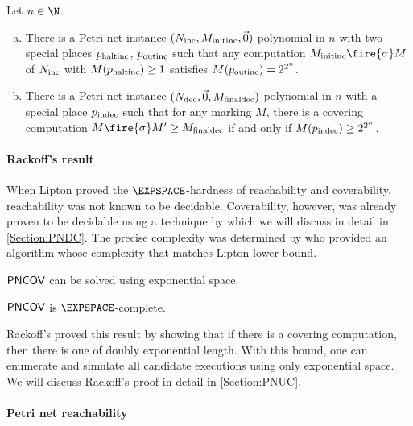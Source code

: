 \documentclass[../../diss.tex]{subfiles}
\begin{document}
\begin{proposition}%
\label{Proposition:Lipton}%
    Let $n \in \N$.
    \begin{enumerate}[a)]
        \item
            There is a Petri net instance $(N_{\text{inc}},M_{{\text{init}}{\text{inc}}},\vec{0})$ polynomial in $n$ with two special places $p_{\text{haltinc}}$, $p_{\text{outinc}}$ such that any computation $\Minitinc \fire{\sigma} M$ of $N_{\text{inc}}$ with $M(p_{\text{haltinc}}) \geq 1$ satisfies $M(p_{\text{outinc}}) = 2^{2^n}$.
        \item
            There is a Petri net instance $(N_{\text{dec}},\vec{0},M_{{\text{final}}{\text{dec}}})$ polynomial in $n$ with a special place $p_{\text{indec}}$ such that for any marking $M$, there is a covering computation $M \fire{\sigma} M' \geq \Mfinaldec$ if and only if $M(p_{\text{indec}}) \geq 2^{2^n}$.
    \end{enumerate}
\end{proposition}

\paragraph{Rackoff's result}

When Lipton proved the $\EXPSPACE$-hardness of reachability and coverability, reachability was not known to be decidable.
Coverability, however, was already proven to be decidable using a technique by  which we will discuss in detail in \cref{Section:PNDC}.
The precise complexity was determined by  who provided an algorithm whose complexity that matches Lipton lower bound.

\begin{theorem}
    $\mathsf{PNCOV}$ can be solved using exponential space.
\end{theorem}

\begin{corollary}
    $\mathsf{PNCOV}$ is $\EXPSPACE$-complete.
\end{corollary}

Rackoff's proved this result by showing that if there is a covering computation, then there is one of doubly exponential length.
With this bound, one can enumerate and simulate all candidate executions using only exponential space.
We will discuss Rackoff's proof in detail in \cref{Section:PNUC}.

\paragraph{Petri net reachability}
\end{document}
